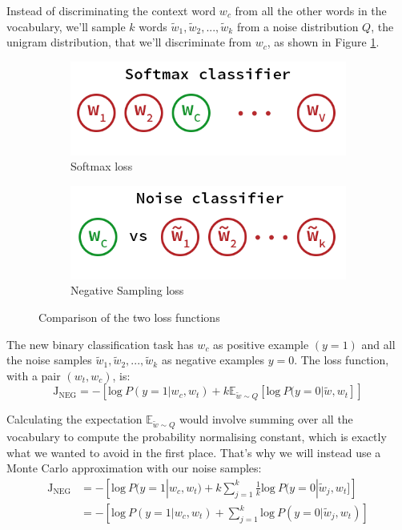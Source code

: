 Instead of discriminating the context word $w_c$ from all the other words in the vocabulary, we'll sample $k$ words $\tilde{w}_1, \tilde{w}_2, ..., \tilde{w}_k$ from a noise distribution $Q$, the unigram distribution, that we'll discriminate from $w_c$, as shown in Figure \ref{discri}.

\begin{figure}[H]
    \begin{subfigure}{.5\textwidth}
        \centering
        \includegraphics[width=0.9\linewidth]{Images/discri-softmax.png}
        \caption{Softmax loss}
    \end{subfigure}
    \begin{subfigure}{.5\textwidth}
        \centering
        \includegraphics[width=0.9\linewidth]{Images/discri-noise.png}
        \caption{Negative Sampling loss}
    \end{subfigure}
    \caption{Comparison of the two loss functions}
    \label{discri}
\end{figure}

The new binary classification task has $w_c$ as positive example $(y=1)$ and all the noise samples $\tilde{w}_1, \tilde{w}_2, ..., \tilde{w}_k$  as negative examples $y=0$. The loss function, with a pair $(w_t, w_c)$, is:
\begin{equation}
    \text{J}_{\text{NEG}}  = -[\text{log}~P(y=1| w_c, w_t) + k\mathbb{E}_{\tilde{w}\sim Q}[\text{log}~P(y=0|\tilde{w}, w_t]]
\end{equation}

Calculating the expectation $\mathbb{E}_{\tilde{w}\sim Q}$ would involve summing over all the vocabulary to compute the probability normalising constant, which is exactly what we wanted to avoid in the first place. That's why we will instead use a Monte Carlo approximation with our noise samples:
\begin{align}
    \text{J}_{\text{NEG}}  &= -\left[\text{log}~P(y=1| w_c, w_t) + k\sum_{j=1}^{k}\frac{1}{k}\text{log}~P(y=0|\tilde{w}_j, w_t]\right]\nonumber \\
     &= -\left[\text{log}~P(y=1| w_c, w_t) + \sum_{j=1}^k\text{log}~P(y=0|\tilde{w}_j, w_t)\right]
\end{align}


